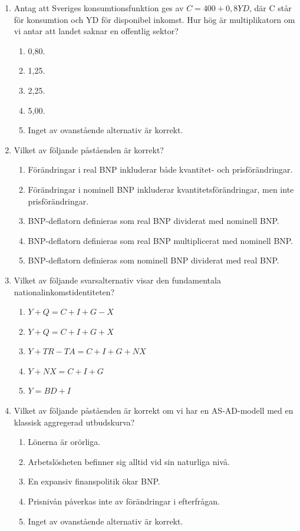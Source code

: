 \documentclass[12pt,a4paper]{article}
\begin{document}
\begin{enumerate}[label=\arabic*.]
    \item Antag att Sveriges konsumtionsfunktion ges av $C = 400 + 0,8YD$, där C står för konsumtion och YD för disponibel inkomst. Hur hög är multiplikatorn om vi antar att landet saknar en offentlig sektor?
    \begin{enumerate}[label=\Alph*.]
        \item 0,80.
        \item 1,25.
        \item 2,25.
        \item 5,00.
        \item Inget av ovanstående alternativ är korrekt.
    \end{enumerate}

    \item Vilket av följande påståenden är korrekt?
    \begin{enumerate}[label=\Alph*.]
        \item Förändringar i real BNP inkluderar både kvantitet- och prisförändringar.
        \item Förändringar i nominell BNP inkluderar kvantitetsförändringar, men inte prisförändringar.
        \item BNP-deflatorn definieras som real BNP dividerat med nominell BNP.
        \item BNP-deflatorn definieras som real BNP multiplicerat med nominell BNP.
        \item BNP-deflatorn definieras som nominell BNP dividerat med real BNP.
    \end{enumerate}

    \item Vilket av följande svarsalternativ visar den fundamentala nationalinkomstidentiteten?
    \begin{enumerate}[label=\Alph*.]
        \item $Y + Q = C + I + G - X$
        \item $Y + Q = C + I + G + X$
        \item $Y + TR - TA = C + I + G + NX$
        \item $Y + NX = C + I + G$
        \item $Y = BD + I$
    \end{enumerate}

    \item Vilket av följande påståenden är korrekt om vi har en AS-AD-modell med en klassisk aggregerad utbudskurva?
    \begin{enumerate}[label=\Alph*.]
        \item Lönerna är orörliga.
        \item Arbetslösheten befinner sig alltid vid sin naturliga nivå.
        \item En expansiv finanspolitik ökar BNP.
        \item Prisnivån påverkas inte av förändringar i efterfrågan.
        \item Inget av ovanstående alternativ är korrekt.
    \end{enumerate}


\end{enumerate}
\end{document}
